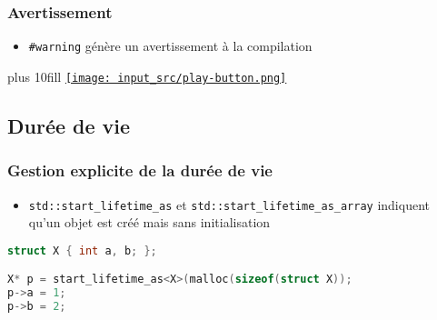 \documentclass[C++.tex]{subfiles}
\begin{document}
\begin{frame}[fragile]
	\frametitle{Avertissement}
	\begin{itemize}
		\item \lstinline|#warning| génère un avertissement à la compilation

	\end{itemize}

	\vskip 10mm plus 10fill
	\hfill
	\href{https://godbolt.org/#g:!((g:!((g:!((h:codeEditor,i:(filename:'1',fontScale:14,fontUsePx:'0',j:1,lang:c%2B%2B,selection:(endColumn:1,endLineNumber:11,positionColumn:1,positionLineNumber:11,selectionStartColumn:1,selectionStartLineNumber:1,startColumn:1,startLineNumber:1),source:'%23include+%3Ciostream%3E%0A+%0Aint+main()%0A%7B%0A%23warning+%22Programme+vide%22%0A%0A%23if+0%0A%23error+%22Programme+vide%22%0A%23endif%0A%7D%0A'),l:'5',n:'0',o:'C%2B%2B+source+%231',t:'0')),k:50,l:'4',n:'0',o:'',s:0,t:'0'),(g:!((h:executor,i:(argsPanelShown:'1',compilationPanelShown:'0',compiler:g122,compilerName:'',compilerOutShown:'0',execArgs:'',execStdin:'',fontScale:14,fontUsePx:'0',j:1,lang:c%2B%2B,libs:!((name:boost,ver:'175')),options:'-std%3Dc%2B%2B23+-Wall+-Wextra+-pedantic',source:1,stdinPanelShown:'1',tree:'1',wrap:'0'),l:'5',n:'0',o:'Executor+x86-64+gcc+12.2+(C%2B%2B,+Editor+%231)',t:'0')),header:(),k:50,l:'4',n:'0',o:'',s:0,t:'0')),l:'2',n:'0',o:'',t:'0')),version:4}{\texttt{[image: input\_src/play-button.png]}}
\end{frame}

\subsection*{Durée de vie}
\begin{frame}[fragile]
	\frametitle{Gestion explicite de la durée de vie}
	\begin{itemize}
		\item \lstinline|std::start_lifetime_as| et \lstinline|std::start_lifetime_as_array| indiquent qu'un objet est créé mais sans initialisation
	\end{itemize}

	\begin{lstlisting}[language=C++]
struct X { int a, b; };

X* p = start_lifetime_as<X>(malloc(sizeof(struct X));
p->a = 1;
p->b = 2;\end{lstlisting}
\end{frame}
\end{document}
